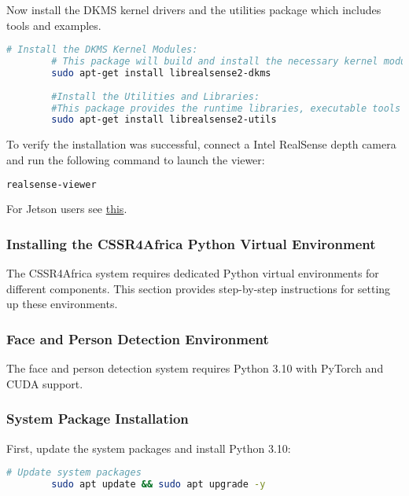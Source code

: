 \documentclass{CSSRforAfrica}
\begin{document}
{		Now install the DKMS kernel drivers and the utilities package which includes tools and examples.
		
		\begin{lstlisting}[style=withoutNumbering, language=bash]
		# Install the DKMS Kernel Modules:
		# This package will build and install the necessary kernel modules for your system and deploy udev rules for device permissions.
		sudo apt-get install librealsense2-dkms
		
		#Install the Utilities and Libraries:
		#This package provides the runtime libraries, executable tools (e.g., realsense-viewer), and examples.
		sudo apt-get install librealsense2-utils
		\end{lstlisting}
		
		To verify the installation was successful, connect a Intel RealSense depth camera and run the following command to launch the viewer:
		
		\begin{lstlisting}[style=withoutNumbering, language=bash]
		realsense-viewer
		\end{lstlisting}
		
		For Jetson users see \href{https://github.com/IntelRealSense/librealsense/blob/master/doc/installation_jetson.md}{this}. 
		
		\subsubsection{Installing the CSSR4Africa Python Virtual Environment}
		The CSSR4Africa system requires dedicated Python virtual environments for different components. This section provides step-by-step instructions for setting up these environments.
		
		
		\subsubsection*{Face and Person Detection Environment}
		The face and person detection system requires Python 3.10 with PyTorch and CUDA support.
		
		\subsubsection*{System Package Installation}
		First, update the system packages and install Python 3.10:
		\begin{lstlisting}[style=withoutNumbering, language=bash]
		# Update system packages
		sudo apt update && sudo apt upgrade -y
		

\end{lstlisting}}
\end{document}
